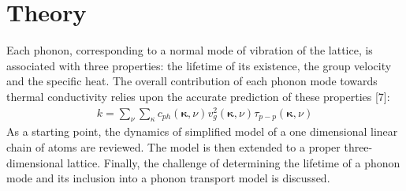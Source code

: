 \documentclass{article}
\numberwithin{equation}{section}
\begin{document}
\section{Theory}

Each phonon, corresponding to a normal mode of vibration of the lattice, is associated with three properties: the lifetime of its existence, the group velocity and the specific heat. The overall contribution of each phonon mode towards thermal conductivity relies upon the accurate prediction of these properties [7]:
\begin{align*}
	k= \sum_\nu\sum_\kappa c_{ph}(\pmb{\kappa},\nu)v^2_g(\pmb{\kappa}, \nu)\tau_{p-p}(\pmb{\kappa}, \nu)
\end{align*}
As a starting point, the dynamics of simplified model of a one dimensional linear chain of atoms are reviewed. The model is then extended to a proper three-dimensional lattice. Finally, the challenge of determining the lifetime of a phonon mode and its inclusion into a phonon transport model is discussed.
\end{document}
